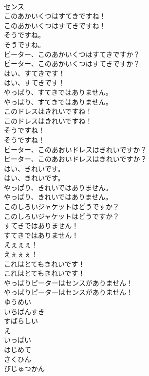\documentclass[8pt]{extreport}
\begin{document}
\begin{CJK}{UTF8}{min}
\\	センス
\\	このあかいくつはすてきですね！	
\\	このあかいくつはすてきですね！ 
\\	そうですね。	
\\	そうですね。 
\\	ピーター、このあかいくつはすてきですか？	
\\	ピーター、このあかいくつはすてきですか？ 
\\	はい、すてきです！	
\\	はい、すてきです！ 
\\	やっぱり、すてきではありません。	
\\	やっぱり、すてきではありません。 
\\	このドレスはきれいですね！	
\\	このドレスはきれいですね！ 
\\	そうですね！	
\\	そうですね！ 
\\	ピーター、このあおいドレスはきれいですか？	
\\	ピーター、このあおいドレスはきれいですか？ 
\\	はい、きれいです。	
\\	はい、きれいです。 
\\	やっぱり、きれいではありません。	
\\	やっぱり、きれいではありません。 
\\	このしろいジャケットはどうですか？	
\\	このしろいジャケットはどうですか？ 
\\	すてきではありません！	
\\	すてきではありません！ 
\\	えぇぇぇ！	
\\	えぇぇぇ！ 
\\	これはとてもきれいです！	
\\	これはとてもきれいです！ 
\\	やっぱりピーターはセンスがありません！	
\\	やっぱりピーターはセンスがありません！ 
\\	ゆうめい
\\	いちばんすき
\\	すばらしい
\\	え
\\	いっぱい
\\	はじめて
\\	さくひん
\\	びじゅつかん

\end{CJK}
\end{document}
